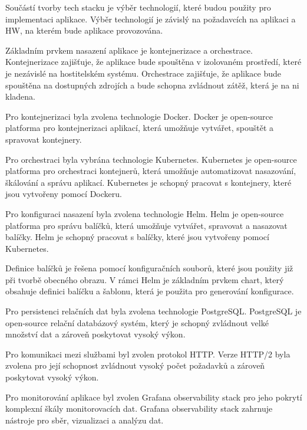 Součástí tvorby tech stacku je výběr technologií, které budou použity pro implementaci aplikace. Výběr technologií je závislý na požadavcích na aplikaci a HW, na kterém bude aplikace provozována.


Základním prvkem nasazení aplikace je kontejnerizace a orchestrace. Kontejnerizace zajišťuje, že aplikace bude spouštěna v izolovaném prostředí, které je nezávislé na hostitelském systému. Orchestrace zajišťuje, že aplikace bude spouštěna na dostupných zdrojích a bude schopna zvládnout zátěž, která je na ni kladena.

Pro kontejnerizaci byla zvolena technologie Docker. Docker je open-source platforma pro kontejnerizaci aplikací, která umožňuje vytvářet, spouštět a spravovat kontejnery.

Pro orchestraci byla vybrána technologie Kubernetes. Kubernetes je open-source platforma pro orchestraci kontejnerů, která umožňuje automatizovat nasazování, škálování a správu aplikací. Kubernetes je schopný pracovat s kontejnery, které jsou vytvořeny pomocí Dockeru.


Pro konfiguraci nasazení byla zvolena technologie Helm. Helm je open-source platforma pro správu balíčků, která umožňuje vytvářet, spravovat a nasazovat balíčky. Helm je schopný pracovat s balíčky, které jsou vytvořeny pomocí Kubernetes.

Definice balíčků je řešena pomocí konfiguračních souborů, které jsou použity již při tvorbě obecného obrazu. V rámci Helm je základním prvkem chart, který obsahuje definici balíčku a šablonu, která je použita pro generování konfigurace.


Pro persistenci relačních dat byla zvolena technologie PostgreSQL. PostgreSQL je open-source relační databázový systém, který je schopný zvládnout velké množství dat a zároveň poskytovat vysoký výkon.


Pro komunikaci mezi službami byl zvolen protokol HTTP. Verze HTTP/2 byla zvolena pro její schopnost zvládnout vysoký počet požadavků a zároveň poskytovat vysoký výkon.


Pro monitorování aplikace byl zvolen Grafana observability stack pro jeho pokrytí komplexní škály monitorovacích dat. Grafana observability stack zahrnuje nástroje pro sběr, vizualizaci a analýzu dat.

